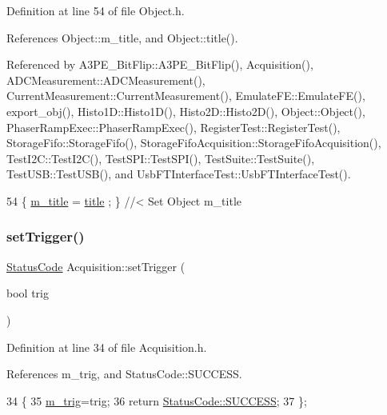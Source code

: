 Definition at line 54 of file Object.\+h.



References Object\+::m\+\_\+title, and Object\+::title().



Referenced by A3\+P\+E\+\_\+\+Bit\+Flip\+::\+A3\+P\+E\+\_\+\+Bit\+Flip(), Acquisition(), A\+D\+C\+Measurement\+::\+A\+D\+C\+Measurement(), Current\+Measurement\+::\+Current\+Measurement(), Emulate\+F\+E\+::\+Emulate\+F\+E(), export\+\_\+obj(), Histo1\+D\+::\+Histo1\+D(), Histo2\+D\+::\+Histo2\+D(), Object\+::\+Object(), Phaser\+Ramp\+Exec\+::\+Phaser\+Ramp\+Exec(), Register\+Test\+::\+Register\+Test(), Storage\+Fifo\+::\+Storage\+Fifo(), Storage\+Fifo\+Acquisition\+::\+Storage\+Fifo\+Acquisition(), Test\+I2\+C\+::\+Test\+I2\+C(), Test\+S\+P\+I\+::\+Test\+S\+P\+I(), Test\+Suite\+::\+Test\+Suite(), Test\+U\+S\+B\+::\+Test\+U\+S\+B(), and Usb\+F\+T\+Interface\+Test\+::\+Usb\+F\+T\+Interface\+Test().


\begin{DoxyCode}
54 \{ \hyperlink{classObject_affbeea1953eb5163573b92fad8f75727}{m\_title} = \hyperlink{classObject_a73a0f1a41828fdd8303dd662446fb6c3}{title} ; \} \textcolor{comment}{//< Set Object m\_title}
\end{DoxyCode}
\mbox{\label{classAcquisition_acdb167b43f3babb59a98698aa5c5066f}} 
\subsubsection{\texorpdfstring{set\+Trigger()}{setTrigger()}\hspace{0.1cm}{\footnotesize\ttfamily [1/2]}}
{\footnotesize\ttfamily \hyperlink{classStatusCode}{Status\+Code} Acquisition\+::set\+Trigger (\begin{DoxyParamCaption}\item[{bool}]{trig }\end{DoxyParamCaption})\hspace{0.3cm}{\ttfamily [inline]}}



Definition at line 34 of file Acquisition.\+h.



References m\+\_\+trig, and Status\+Code\+::\+S\+U\+C\+C\+E\+SS.


\begin{DoxyCode}
34                                    \{
35     \hyperlink{classAcquisition_a953bdc1bf56206b6df33b648af32a24f}{m\_trig}=trig; 
36     \textcolor{keywordflow}{return} \hyperlink{classStatusCode_a6f565cbeadc76d14c72f047e5e85eb4badd0da38d3ba0d922efd1f4619bc37ad8}{StatusCode::SUCCESS};
37   \};
\end{DoxyCode}
\mbox{\label{classAcquisition_acdb167b43f3babb59a98698aa5c5066f}} 
